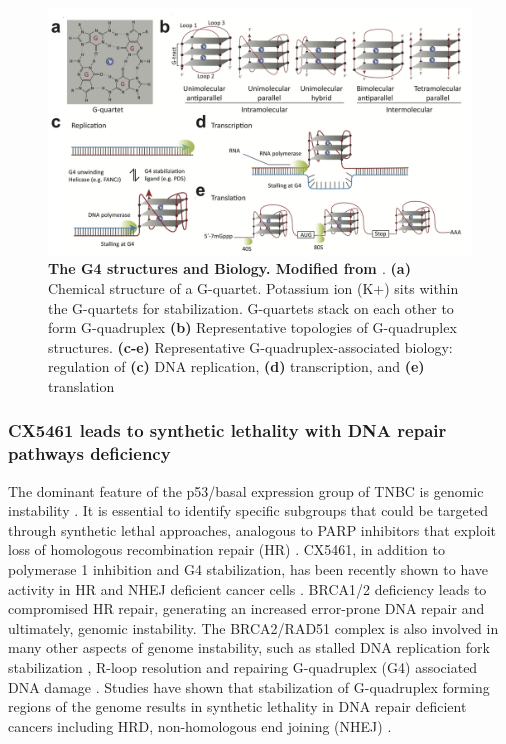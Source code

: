 \begin{figure}
\centering
\includegraphics[width=\textwidth]{Figures/chap1/G4structures.png}
	\caption[The G4 structures and their biology]
	{\small
	    \textbf{The G4 structures and Biology. Modified from \cite{kwok2017g}}.
	   \textbf{(a)} Chemical structure of a G-quartet. Potassium ion (K+) sits within the G-quartets for stabilization. G-quartets stack on each other to form G-quadruplex \textbf{(b)} Representative topologies of G-quadruplex structures. \textbf{(c-e)} Representative G-quadruplex-associated biology: regulation of \textbf{(c)} DNA replication, \textbf{(d)} transcription, and \textbf{(e)} translation
	}
	\label{fig:G4structures}
\end{figure}
 
 \subsubsection{CX5461 leads to synthetic lethality with  DNA repair pathways deficiency}
 The dominant feature of the p53/basal expression group of TNBC is genomic instability \cite{yu2013identification}. It is essential to identify specific subgroups that could be targeted through synthetic lethal approaches, analogous to PARP inhibitors that exploit loss of homologous recombination repair (HR) \cite{fong2009inhibition}.
 CX5461, in addition to polymerase 1 inhibition and G4 stabilization, has been recently shown to have activity in \ac{HR} and \ac{NHEJ} deficient cancer cells \cite{zimmer2016targeting,xu2017cx}. 
 BRCA1/2 deficiency leads to compromised HR repair, generating an increased error-prone DNA repair and ultimately, genomic instability. The BRCA2/RAD51 complex is also involved in many other aspects of genome instability, such as stalled DNA replication fork stabilization \cite{schlacher2011double}, R-loop resolution \cite{bhatia2014brca2} and repairing G-quadruplex (G4) associated DNA damage .
 Studies have shown that stabilization of G-quadruplex forming regions of the genome results in synthetic lethality in DNA repair deficient cancers including HRD, non-homologous end joining (NHEJ) \cite{xu2017cx, mcluckie2013g, zimmer2016targeting}. 
  
